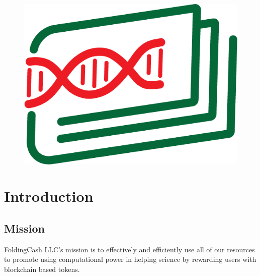 \documentclass[letterpaper,12pt,titlepage]{article}
\title{\org}
\author{Miguel Molina Jr.}
\date{\today\\v1.0.0}
\def\org{FoldingCash LLC}
\def\ticker{FLDCH}
\begin{document}
\begin{figure}
    \centering
    \includegraphics[width=0.5\linewidth]{FoldingCash_Logo.png}
\end{figure}

\maketitle

\begin{abstract}
    The \org{} organization was created to incentivize people to use their time, computer hardware, and electricity to continue and grow the amount of research that is being performed by Folding@Home. We want to incentivize users by leveraging a distributed and friction-less token model just like Folding@Home uses a distributed and friction-less model for their research. The \ticker{} token is built using BitcoinCash's CashTokens technology because \org{} believes that BitcoinCash will continue to be an affordable blockchain to transact on and provides token technology as a first class citizen. We will distribute the token but do not guarantee any return on a user's token earnings and the token does not provide any type of say or stake into the company. However, instead our focus will be on providing utility to the token; which we believe will increase people's desire to earn the token and drive people to Folding@Home.
\end{abstract}

\section{Introduction}

\subsection{Mission}
\org{'s} mission is to effectively and efficiently use all of our resources to promote using computational power in helping science by rewarding users with blockchain based tokens.
\end{document}
